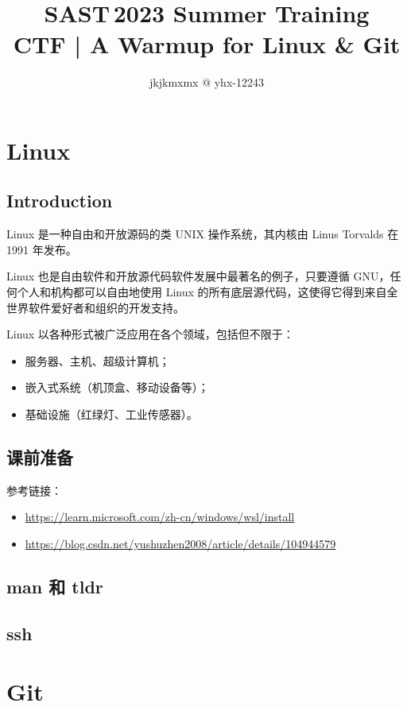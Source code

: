 \documentclass{article}
\title{SAST\,2023 Summer Training\\CTF | A Warmup for Linux \& Git}
\author{jkjkmxmx @ yhx-12243}
\begin{document}
	\maketitle
	\let\labelitemi\labelitemiii

	\section{Linux}

	\subsection{Introduction}

	Linux 是一种自由和开放源码的类 UNIX 操作系统，其内核由 Linus Torvalds 在 1991 年发布。

	Linux 也是自由软件和开放源代码软件发展中最著名的例子，只要遵循 GNU，任何个人和机构都可以自由地使用 Linux 的所有底层源代码，这使得它得到来自全世界软件爱好者和组织的开发支持。

	Linux 以各种形式被广泛应用在各个领域，包括但不限于：
	\begin{itemize}
		\itemsep0pt
		\item 服务器、主机、超级计算机；
		\item 嵌入式系统（机顶盒、移动设备等）；
		\item 基础设施（红绿灯、工业传感器）。\cite{net9-linux}
	\end{itemize}

	\subsection{课前准备}

	参考链接：
	\begin{itemize}
		\itemsep0pt
		\item \url{https://learn.microsoft.com/zh-cn/windows/wsl/install}
		\item \url{https://blog.csdn.net/yushuzhen2008/article/details/104944579}
	\end{itemize}


	\subsection{man 和 tldr}

	\subsection{ssh}


	\section{Git}
\end{document}
